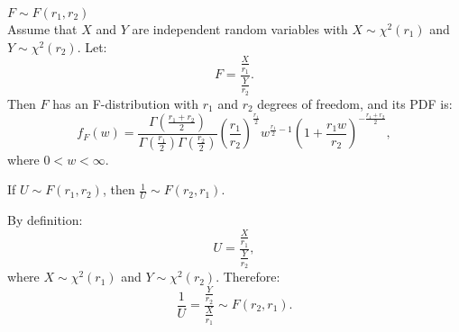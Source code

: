 \documentclass{huhtakm-template-book-v2}
\begin{document}
    \begin{eg} $F \sim F(r_{1},r_{2})$\\
        Assume that $X$ and $Y$ are independent random variables with $X \sim \chi^{2}(r_{1})$ and $Y \sim \chi^{2}(r_{2})$. Let:
        \begin{equation*}
            F = \frac{\frac{X}{r_{1}}}{\frac{Y}{r_{2}}}.
        \end{equation*}
        Then $F$ has an F-distribution with $r_{1}$ and $r_{2}$ degrees of freedom, and its PDF is:
        \begin{equation*}
            f_{F}(w) = \frac{\Gamma\left(\frac{r_{1}+r_{2}}{2}\right)}{\Gamma\left(\frac{r_{1}}{2}\right)\Gamma\left(\frac{r_{2}}{2}\right)}\left(\frac{r_{1}}{r_{2}}\right)^{\frac{r_{1}}{2}}w^{\frac{r_{1}}{2}-1}\left(1+\frac{r_{1}w}{r_{2}}\right)^{-\frac{r_{1}+r_{2}}{2}},
        \end{equation*}
        where $0 < w < \infty$.
    \end{eg}
    \begin{lem}
        If $U \sim F(r_{1},r_{2})$, then $\frac{1}{U} \sim F(r_{2},r_{1})$.
    \end{lem}
    \begin{proofing}
        By definition:
        \begin{equation*}
            U = \frac{\frac{X}{r_{1}}}{\frac{Y}{r_{2}}},
        \end{equation*}
        where $X \sim \chi^{2}(r_{1})$ and $Y \sim \chi^{2}(r_{2})$. Therefore:
        \begin{equation*}
            \frac{1}{U} = \frac{\frac{Y}{r_{2}}}{\frac{X}{r_{1}}} \sim F(r_{2},r_{1}).
        \end{equation*}
    \end{proofing}
    \newpage
\end{document}
